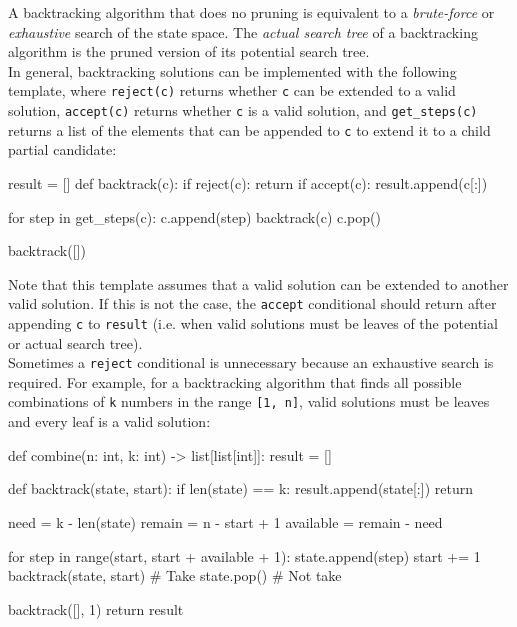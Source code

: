 \documentclass[12pt, titlepage]{article}
\begin{document}
A backtracking algorithm that does no pruning is equivalent to a \textit{brute-force} or \textit{exhaustive} search of the state space. The \textit{actual search tree} of a backtracking algorithm is the pruned version of its potential search tree. \\

In general, backtracking solutions can be implemented with the following template, where \texttt{reject(c)} returns whether \texttt{c} can be extended to a valid solution, \texttt{accept(c)} returns whether \texttt{c} is a valid solution, and \texttt{get\_steps(c)} returns a list of the elements that can be appended to \texttt{c} to extend it to a child partial candidate: \medskip

\begin{python}
result = []
def backtrack(c):
    if reject(c):
        return
    if accept(c):
        result.append(c[:])

    for step in get_steps(c):
        c.append(step)
        backtrack(c)
        c.pop()

backtrack([])
\end{python} \medskip

Note that this template assumes that a valid solution can be extended to another valid solution. If this is not the case, the \texttt{accept} conditional should return after appending \texttt{c} to \texttt{result} (i.e. when valid solutions must be leaves of the potential or actual search tree). \\

Sometimes a \texttt{reject} conditional is unnecessary because an exhaustive search is required. For example, for a backtracking algorithm that finds all possible combinations of \texttt{k} numbers in the range \texttt{[1, n]}, valid solutions must be leaves and every leaf is a valid solution: \medskip

\begin{python}
def combine(n: int, k: int) -> list[list[int]]:
    result = []

    def backtrack(state, start):
        if len(state) == k:
            result.append(state[:])
            return
       
        need = k - len(state)
        remain = n - start + 1
        available = remain - need

        for step in range(start, start + available + 1):
            state.append(step)
            start += 1
            backtrack(state, start)  # Take
            state.pop()  # Not take

    backtrack([], 1)
    return result
\end{python}
\end{document}
